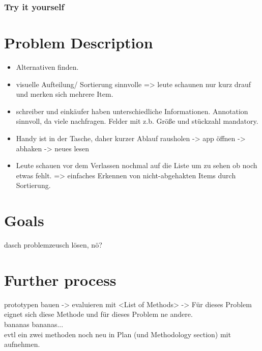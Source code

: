 \documentclass{scrartcl}
\begin{document}
    \subsubsection{Try it yourself}

\section{Problem Description}
\label{sec:problem}
\begin{itemize}
\item Alternativen finden.\\
\item visuelle Aufteilung/ Sortierung sinnvolle => leute schaunen nur kurz drauf und merken sich mehrere Item. \\
\item schreiber und einkäufer haben unterschiedliche Informationen. Annotation sinnvoll, da viele nachfragen. Felder mit z.b. Größe und stückzahl mandatory. \\
\item Handy ist in der Tasche, daher kurzer Ablauf rausholen -> app öffnen -> abhaken -> neues lesen
\item Leute schauen vor dem Verlassen nochmal auf die Liste um zu sehen ob noch etwas fehlt. => einfaches Erkennen von nicht-abgehakten Items durch Sortierung.\\

\end{itemize}



\section{Goals}
\label{sec:goal}
dasch problemzeusch lösen, nö?


\section{Further process}
\label{sec:process}
prototypen bauen -> evaluieren mit <List of Methods> -> Für dieses Problem eignet sich diese Methode und für dieses Problem ne andere.\\
bananas bananas... \\
evtl ein zwei methoden noch neu in Plan (und Methodology section) mit aufnehmen.\\
\end{document}
